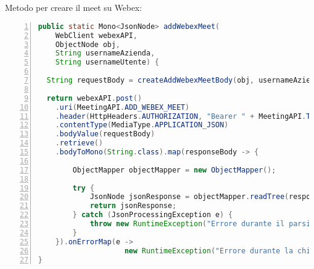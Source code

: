 \\
\\
Metodo per creare il meet su Webex:
\begin{lstlisting}[language=java, frame=lines, basicstyle=\ttfamily\scriptsize, numbers=left]
public static Mono<JsonNode> addWebexMeet(
    WebClient webexAPI, 
    ObjectNode obj, 
    String usernameAzienda,
    String usernameUtente) {

  String requestBody = createAddWebexMeetBody(obj, usernameAzienda, usernameUtente);

  return webexAPI.post()
    .uri(MeetingAPI.ADD_WEBEX_MEET)
    .header(HttpHeaders.AUTHORIZATION, "Bearer " + MeetingAPI.TOKEN)
    .contentType(MediaType.APPLICATION_JSON)
    .bodyValue(requestBody)
    .retrieve()
    .bodyToMono(String.class).map(responseBody -> {

        ObjectMapper objectMapper = new ObjectMapper();
            
        try {
            JsonNode jsonResponse = objectMapper.readTree(responseBody);
            return jsonResponse;
        } catch (JsonProcessingException e) {
            throw new RuntimeException("Errore durante il parsing della risposta JSON", e);
        }
    }).onErrorMap(e -> 
                    new RuntimeException("Errore durante la chiamata all'API di Webex", e));
}
\end{lstlisting}
